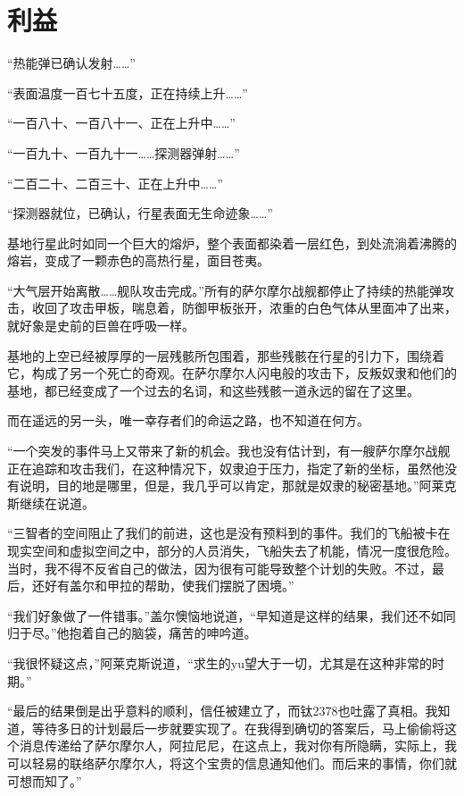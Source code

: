 \chapter{利益}

“热能弹已确认发射……” 

“表面温度一百七十五度，正在持续上升……” 

“一百八十、一百八十一、正在上升中……” 

“一百九十、一百九十一……探测器弹射……” 

“二百二十、二百三十、正在上升中……” 

“探测器就位，已确认，行星表面无生命迹象……” 

基地行星此时如同一个巨大的熔炉，整个表面都染着一层红色，到处流淌着沸腾的熔岩，变成了一颗赤色的高热行星，面目苍夷。 

“大气层开始离散……舰队攻击完成。”所有的萨尔摩尔战舰都停止了持续的热能弹攻击，收回了攻击甲板，喘息着，防御甲板张开，浓重的白色气体从里面冲了出来，就好象是史前的巨兽在呼吸一样。 

基地的上空已经被厚厚的一层残骸所包围着，那些残骸在行星的引力下，围绕着它，构成了另一个死亡的奇观。在萨尔摩尔人闪电般的攻击下，反叛奴隶和他们的基地，都已经变成了一个过去的名词，和这些残骸一道永远的留在了这里。 

而在遥远的另一头，唯一幸存者们的命运之路，也不知道在何方。 

“一个突发的事件马上又带来了新的机会。我也没有估计到，有一艘萨尔摩尔战舰正在追踪和攻击我们，在这种情况下，奴隶迫于压力，指定了新的坐标，虽然他没有说明，目的地是哪里，但是，我几乎可以肯定，那就是奴隶的秘密基地。”阿莱克斯继续在说道。 

“三智者的空间阻止了我们的前进，这也是没有预料到的事件。我们的飞船被卡在现实空间和虚拟空间之中，部分的人员消失，飞船失去了机能，情况一度很危险。当时，我不得不反省自己的做法，因为很有可能导致整个计划的失败。不过，最后，还好有盖尔和甲拉的帮助，使我们摆脱了困境。” 

“我们好象做了一件错事。”盖尔懊恼地说道，“早知道是这样的结果，我们还不如同归于尽。”他抱着自己的脑袋，痛苦的呻吟道。 

“我很怀疑这点，”阿莱克斯说道，“求生的yu望大于一切，尤其是在这种非常的时期。” 

“最后的结果倒是出乎意料的顺利，信任被建立了，而钛2378也吐露了真相。我知道，等待多日的计划最后一步就要实现了。在我得到确切的答案后，马上偷偷将这个消息传递给了萨尔摩尔人，阿拉尼尼，在这点上，我对你有所隐瞒，实际上，我可以轻易的联络萨尔摩尔人，将这个宝贵的信息通知他们。而后来的事情，你们就可想而知了。” 

